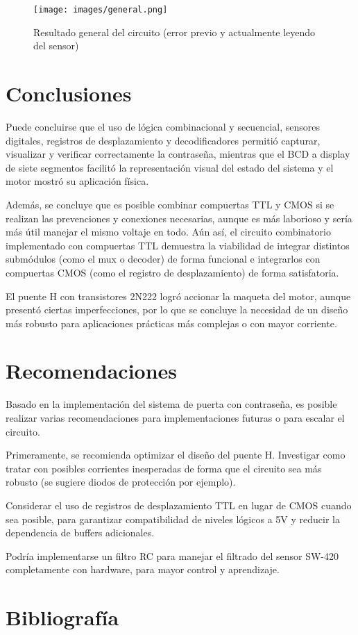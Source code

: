\documentclass[conference]{IEEEtran}  %
\begin{document}
\begin{figure}[h]
    \centering
    \texttt{[image: images/general.png]}
    \caption{Resultado general del circuito (error previo y actualmente leyendo del sensor)}
    \label{fig:general}
\end{figure}

\section{Conclusiones}

Puede concluirse que el uso de lógica combinacional y secuencial, sensores digitales, registros de desplazamiento y decodificadores permitió capturar, visualizar y verificar correctamente la contraseña, mientras que el BCD a display de siete segmentos facilitó la representación visual del estado del sistema y el motor mostró su aplicación física. 

Además, se concluye que es posible combinar compuertas TTL y CMOS si se realizan las prevenciones y conexiones necesarias, aunque es más laborioso y sería más útil manejar el mismo voltaje en todo. Aún así, el circuito combinatorio implementado con compuertas TTL demuestra la viabilidad de integrar distintos submódulos (como el mux o decoder) de forma funcional e integrarlos con compuertas CMOS (como el registro de desplazamiento) de forma satisfatoria. 

El puente H con transistores 2N222 logró accionar la maqueta del motor, aunque presentó ciertas imperfecciones, por lo que se concluye la necesidad de un diseño más robusto para aplicaciones prácticas más complejas o con mayor corriente.

\section{Recomendaciones}

Basado en la implementación del sistema de puerta con contraseña, es posible realizar varias recomendaciones para implementaciones futuras o para escalar el circuito.

Primeramente, se recomienda optimizar el diseño del puente H. Investigar como tratar con posibles corrientes inesperadas de forma que el circuito sea más robusto (se sugiere diodos de protección por ejemplo).

Considerar el uso de registros de desplazamiento TTL en lugar de CMOS cuando sea posible, para garantizar compatibilidad de niveles lógicos a 5V y reducir la dependencia de buffers adicionales.

Podría implementarse un filtro RC para manejar el filtrado del sensor SW-420 completamente con hardware, para mayor control y aprendizaje.


\section*{Bibliografía}

\end{document}
